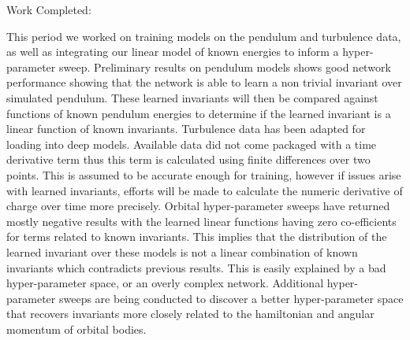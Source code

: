 \documentclass[10pt,letterpaper]{report}
\author{Brandon Houghton}
\begin{document}
	
	Work Completed:
	
	This period we worked on training models on the pendulum and turbulence data, as well as integrating our linear model of known energies to inform a hyper-parameter sweep. 
	Preliminary results on pendulum models shows good network performance showing that the network is able to learn a non trivial invariant over simulated pendulum. These learned invariants will then be compared against functions of known pendulum energies to determine if the learned invariant is a linear function of known invariants. 
	Turbulence data has been adapted for loading into deep models. Available data did not come packaged with a time derivative term thus this term is calculated using finite differences over two points. This is assumed to be accurate enough for training, however if issues arise with learned invariants, efforts will be made to calculate the numeric derivative of charge over time more precisely.
	Orbital hyper-parameter sweeps have returned mostly negative results with the learned linear functions having zero co-efficients for terms related to known invariants. This implies that the distribution of the learned invariant over these models is not a linear combination of known invariants which contradicts previous results. This is easily explained by a bad hyper-parameter space, or an overly complex network. Additional hyper-parameter sweeps are being conducted to discover a better hyper-parameter space that recovers invariants more closely related to the hamiltonian and angular momentum of orbital bodies.
	
	
	
\end{document}
